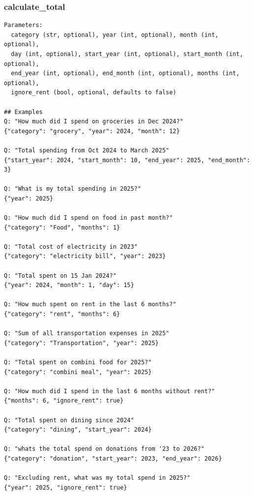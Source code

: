 \documentclass[11pt,twocolumn]{article}
\begin{document}
\subsubsection{calculate\_total}
\begin{scriptsize}
\begin{verbatim}
Parameters:
  category (str, optional), year (int, optional), month (int, optional),
  day (int, optional), start_year (int, optional), start_month (int, optional),
  end_year (int, optional), end_month (int, optional), months (int, optional),
  ignore_rent (bool, optional, defaults to false)

## Examples
Q: "How much did I spend on groceries in Dec 2024?"
{"category": "grocery", "year": 2024, "month": 12}

Q: "Total spending from Oct 2024 to March 2025"
{"start_year": 2024, "start_month": 10, "end_year": 2025, "end_month": 3}

Q: "What is my total spending in 2025?"
{"year": 2025}

Q: "How much did I spend on food in past month?"
{"category": "Food", "months": 1}

Q: "Total cost of electricity in 2023"
{"category": "electricity bill", "year": 2023}

Q: "Total spent on 15 Jan 2024?"
{"year": 2024, "month": 1, "day": 15}

Q: "How much spent on rent in the last 6 months?"
{"category": "rent", "months": 6}

Q: "Sum of all transportation expenses in 2025"
{"category": "Transportation", "year": 2025}

Q: "Total spent on combini food for 2025?"
{"category": "combini meal", "year": 2025}

Q: "How much did I spend in the last 6 months without rent?"
{"months": 6, "ignore_rent": true}

Q: "Total spent on dining since 2024"
{"category": "dining", "start_year": 2024}

Q: "whats the total spend on donations from '23 to 2026?"
{"category": "donation", "start_year": 2023, "end_year": 2026}

Q: "Excluding rent, what was my total spend in 2025?"
{"year": 2025, "ignore_rent": true}
\end{verbatim}
\end{scriptsize}
\end{document}
